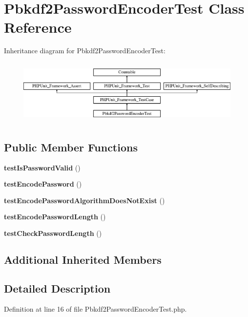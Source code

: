\section{Pbkdf2\+Password\+Encoder\+Test Class Reference}
\label{class_symfony_1_1_component_1_1_security_1_1_core_1_1_tests_1_1_encoder_1_1_pbkdf2_password_encoder_test}
Inheritance diagram for Pbkdf2\+Password\+Encoder\+Test\+:\begin{figure}[H]
\begin{center}
\leavevmode
\includegraphics[height=3.303835cm]{class_symfony_1_1_component_1_1_security_1_1_core_1_1_tests_1_1_encoder_1_1_pbkdf2_password_encoder_test}
\end{center}
\end{figure}
\subsection*{Public Member Functions}
\begin{DoxyCompactItemize}
\item 
{\bf test\+Is\+Password\+Valid} ()
\item 
{\bf test\+Encode\+Password} ()
\item 
{\bf test\+Encode\+Password\+Algorithm\+Does\+Not\+Exist} ()
\item 
{\bf test\+Encode\+Password\+Length} ()
\item 
{\bf test\+Check\+Password\+Length} ()
\end{DoxyCompactItemize}
\subsection*{Additional Inherited Members}


\subsection{Detailed Description}


Definition at line 16 of file Pbkdf2\+Password\+Encoder\+Test.\+php.



